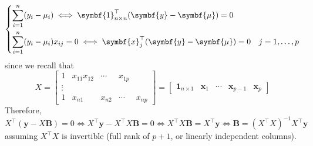 \[ \begin{dcases}
        \sum\limits_{i=1}^{n} (y_i-\mu_i)\iff \symbf{1}_{n\times n}^\top(\symbf{y}-\symbf{\mu})=0 \\
        \sum\limits_{i=1}^{n} (y_i-\mu_i)x_{ij}=0\iff \symbf{x}_{j}^\top
        (\symbf{y}-\symbf{\mu})=0 & j=1,\ldots,p
    \end{dcases} \]
since we recall that
\[ X=\begin{bmatrix}
        1 & x_{11} x_{12} & \cdots & x_{1p}          \\
        \vdots                                       \\
        1 & x_{n1}        & x_{n2} & \cdots & x_{np}
    \end{bmatrix}=
    \begin{bmatrix}
        \symbf{1}_{n\times 1} & \symbf{x}_1 & \cdots & \symbf{x}_{p-1} & \symbf{x}_p
    \end{bmatrix} \]
Therefore,
\[ X^\top(\symbf{y}-X\symbf{B})=0\iff
    X^\top \symbf{y}-X^\top X\symbf{B}=0\iff
    X^\top X \symbf{B}=X^\top \symbf{y}\iff
    \symbf{B}=(X^\top X)^{-1}X^\top \symbf{y} \]
assuming $ X^\top X $ is invertible (full rank of $ p+1 $, or linearly
independent columns).

